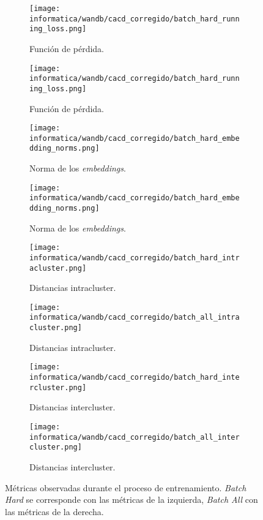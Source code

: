 \begin{figure}[!hbtp]
    \centering
    \begin{subfigure}{.5\textwidth}
        \centering
        \texttt{[image: informatica/wandb/cacd\_corregido/batch\_hard\_running\_loss.png]}
        \caption{Función de pérdida.}
    \end{subfigure}%
    \begin{subfigure}{.5\textwidth}
        \centering
        \texttt{[image: informatica/wandb/cacd\_corregido/batch\_hard\_running\_loss.png]}
        \caption{Función de pérdida.}
    \end{subfigure}

    \begin{subfigure}{.5\textwidth}
        \centering
        \texttt{[image: informatica/wandb/cacd\_corregido/batch\_hard\_embedding\_norms.png]}
        \caption{Norma de los \textit{embeddings}.}
    \end{subfigure}%
    \begin{subfigure}{.5\textwidth}
        \centering
        \texttt{[image: informatica/wandb/cacd\_corregido/batch\_hard\_embedding\_norms.png]}
        \caption{Norma de los \textit{embeddings}.}
    \end{subfigure}

    \begin{subfigure}{.5\textwidth}
        \centering
        \texttt{[image: informatica/wandb/cacd\_corregido/batch\_hard\_intracluster.png]}
        \caption{Distancias intracluster.}
    \end{subfigure}%
    \begin{subfigure}{.5\textwidth}
        \centering
        \texttt{[image: informatica/wandb/cacd\_corregido/batch\_all\_intracluster.png]}
        \caption{Distancias intracluster.}
    \end{subfigure}

    \begin{subfigure}{.5\textwidth}
        \centering
        \texttt{[image: informatica/wandb/cacd\_corregido/batch\_hard\_intercluster.png]}
        \caption{Distancias intercluster.}
    \end{subfigure}%
    \begin{subfigure}{.5\textwidth}
        \centering
        \texttt{[image: informatica/wandb/cacd\_corregido/batch\_all\_intercluster.png]}
        \caption{Distancias intercluster.}
    \end{subfigure}
    \caption{Métricas observadas durante el proceso de entrenamiento. \textit{Batch Hard} se corresponde con las métricas de la izquierda, \textit{Batch All} con las métricas de la derecha.}
    \label{img:proceso_entrenamiento_cacd_corregido}
\end{figure}

